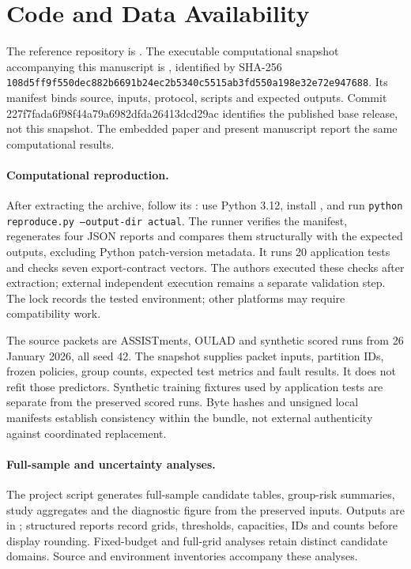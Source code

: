 
\section{Code and Data Availability}
\label{app:repro}
\label{app:mechanism-positioning}
The reference repository is \CompassRepoURL. The executable computational snapshot accompanying this manuscript is , identified by SHA-256 \texttt{108d5ff9f550dec8\allowbreak 82b6691b24ec2b534\allowbreak 0c5515ab3fd550a1\allowbreak 98e32e72e947688}. Its manifest binds source, inputs, protocol, scripts and expected outputs. Commit 227f7fada6f98f44a79a6982dfda26413dcd29ac identifies the published base release, not this snapshot. The embedded paper and present manuscript report the same computational results.

\paragraph{Computational reproduction.}
After extracting the archive, follow its : use Python 3.12, install , and run \texttt{python reproduce.py --output-dir actual}. The runner verifies the manifest, regenerates four JSON reports and compares them structurally with the expected outputs, excluding Python patch-version metadata. It runs 20 application tests and checks seven export-contract vectors. The authors executed these checks after extraction; external independent execution remains a separate validation step. The lock records the tested environment; other platforms may require compatibility work.

The source packets are ASSISTments, OULAD and synthetic scored runs from 26 January 2026, all seed 42. The snapshot supplies packet inputs, partition IDs, frozen policies, group counts, expected test metrics and fault results. It does not refit those predictors. Synthetic training fixtures used by application tests are separate from the preserved scored runs. Byte hashes and unsigned local manifests establish consistency within the bundle, not external authenticity against coordinated replacement.

\paragraph{Full-sample and uncertainty analyses.}
The project script  generates full-sample candidate tables, group-risk summaries, study aggregates and the diagnostic figure from the preserved inputs. Outputs are in ; structured reports record grids, thresholds, capacities, IDs and counts before display rounding. Fixed-budget and full-grid analyses retain distinct candidate domains. Source and environment inventories accompany these analyses.

